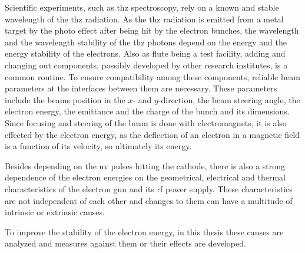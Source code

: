 Scientific experiments, such as \gls{thz} spectroscopy, rely on a known and stable wavelength of the \gls{thz} radiation. As the \gls{thz} radiation is emitted from a metal target by the photo effect after being hit by the electron bunches, the wavelength and the wavelength stability of the \gls{thz} photons depend on the energy and the energy stability of the electrons.
Also as \gls{flute} being a test facility, adding and changing out components, possibly developed by other research institutes, is a common routine. To ensure compatibility among these components, reliable beam parameters at the interfaces between them are necessary. These parameters include the beams position in the $x$- and $y$-direction, the beam steering angle, the electron energy, the emittance and the charge of the bunch and its dimensions. Since focusing and steering of the beam is done with electromagnets, it is also effected by the electron energy, as the deflection of an electron in a magnetic field is a function of its velocity, so ultimately its energy.

Besides depending on the \gls{uv} pulses hitting the cathode, there is also a strong dependence of the electron energies on the geometrical, electrical and thermal characteristics of the electron gun and its \gls{rf} power supply. These characteristics are not independent of each other and changes to them can have a multitude of intrinsic or extrinsic causes.

To improve the stability of the electron energy, in this thesis these causes are analyzed and measures against them or their effects are developed.

